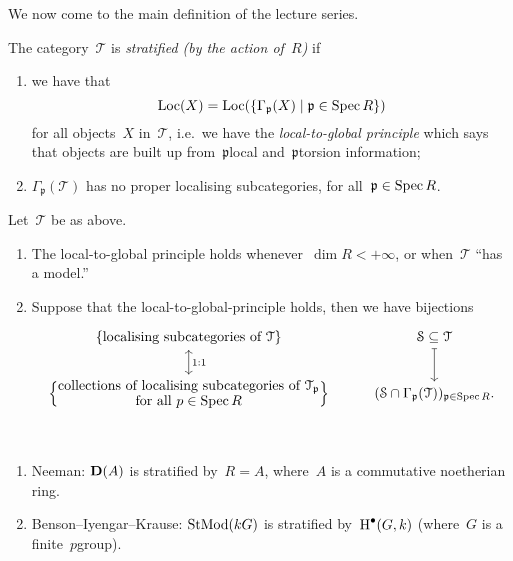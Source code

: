 \documentclass[10pt,a4paper]{article}
\begin{document}
We now come to the main definition of the lecture series.
\begin{definition}
  The category~$\mathcal{T}$ is \emph{stratified (by the action of~$R$)} if
  \begin{enumerate}
    \item we have that
      \begin{equation}
        \operatorname{Loc}(X)=\operatorname{Loc}(\{\Gamma_{\mathfrak{p}}(X)\mid\mathfrak{p}\in\operatorname{Spec} R\})
      \end{equation}
      for all objects~$X$ in~$\mathcal{T}$, i.e.\ we have the \emph{local-to-global principle} which says that objects are built up from~$\mathfrak{p}$\dash local and~$\mathfrak{p}$\dash torsion information;
    \item $\Gamma_{\mathfrak{p}}(\mathcal{T})$ has no proper localising subcategories, for all~$\mathfrak{p}\in\operatorname{Spec} R$.
  \end{enumerate}
\end{definition}

\begin{proposition}
  Let~$\mathcal{T}$ be as above.
  \begin{enumerate}
    \item The local-to-global principle holds whenever~$\dim R<+\infty$, or when~$\mathcal{T}$ ``has a model.''
    \item Suppose that the local-to-global-principle holds, then we have bijections
      \begin{equation}
        \begin{tikzcd}
          \left\{ \text{localising subcategories of $\mathcal{T}$} \right\} \arrow[leftrightarrow]{d}{1:1} & \mathcal{S}\subseteq\mathcal{T} \arrow[mapsto]{d} \\
          \left\{ \substack{\displaystyle\text{collections of localising subcategories of~$\mathcal{T}_{\mathfrak{p}}$} \\ \displaystyle\text{for all $p\in\Spec R$}} \right\} & (\mathcal{S}\cap\Gamma_{\mathfrak{p}}(\mathcal{T}))_{\mathfrak{p}\in\Spec R}.
        \end{tikzcd}
      \end{equation}
  \end{enumerate}
\end{proposition}

\begin{example} {\ }
  \begin{enumerate}
    \item Neeman: $\mathbf{D}(A)$ is stratified by~$R=A$, where~$A$ is a commutative noetherian ring.
    \item Benson--Iyengar--Krause: $\operatorname{StMod}(kG)$ is stratified by~$\operatorname{H}^\bullet(G,k)$ (where~$G$ is a finite~$p$\dash group).
  \end{enumerate}
\end{example}
\end{document}
